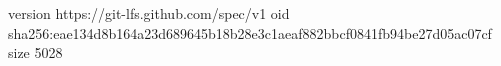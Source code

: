 version https://git-lfs.github.com/spec/v1
oid sha256:eae134d8b164a23d689645b18b28e3c1aeaf882bbcf0841fb94be27d05ac07cf
size 5028
